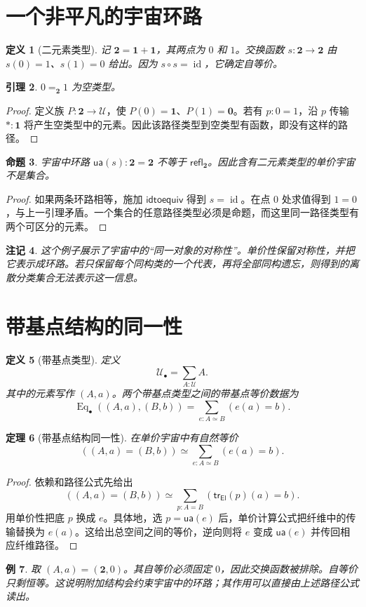 \documentclass[12pt,oneside,openany,fontset=none]{ctexbook}
\theoremstyle{cn}
\newtheorem{definition}{定义}[chapter]
\newtheorem{example}[definition]{例}
\newtheorem{lemma}[definition]{引理}
\newtheorem{proposition}[definition]{命题}
\newtheorem{theorem}[definition]{定理}
\newtheorem{remark}[definition]{注记}
\numberwithin{equation}{chapter}
\newcommand{\U}{\mathcal U}
\newcommand{\id}{\operatorname{id}}
\newcommand{\refl}{\mathsf{refl}}
\newcommand{\tr}{\mathsf{tr}}
\newcommand{\ua}{\mathsf{ua}}
\newcommand{\idtoequiv}{\mathsf{idtoequiv}}
\newcommand{\Eq}{\operatorname{Eq}}
\newcommand{\one}{\mathbf 1}
\newcommand{\zero}{\mathbf 0}
\begin{document}
\section{一个非平凡的宇宙环路}
\begin{definition}[二元素类型]
记 $\mathbf2=\one+\one$，其两点为 $0$ 和 $1$。交换函数 $s:\mathbf2\to\mathbf2$ 由 $s(0)=1$、$s(1)=0$ 给出。因为 $s\circ s=\id$，它确定自等价。
\end{definition}
\begin{lemma}
$0=_{\mathbf2}1$ 为空类型。
\end{lemma}
\begin{proof}
定义族 $P:\mathbf2\to\U$，使 $P(0)=\one$、$P(1)=\zero$。若有 $p:0=1$，沿 $p$ 传输 $*:\one$ 将产生空类型中的元素。因此该路径类型到空类型有函数，即没有这样的路径。
\end{proof}
\begin{proposition}
宇宙中环路 $\ua(s):\mathbf2=\mathbf2$ 不等于 $\refl_{\mathbf2}$。因此含有二元素类型的单价宇宙不是集合。
\end{proposition}
\begin{proof}
如果两条环路相等，施加 $\idtoequiv$ 得到 $s=\id$。在点 $0$ 处求值得到 $1=0$，与上一引理矛盾。一个集合的任意路径类型必须是命题，而这里同一路径类型有两个可区分的元素。
\end{proof}
\begin{remark}
这个例子展示了宇宙中的“同一对象的对称性”。单价性保留对称性，并把它表示成环路。若只保留每个同构类的一个代表，再将全部同构遗忘，则得到的离散分类集合无法表示这一信息。
\end{remark}

\section{带基点结构的同一性}
\begin{definition}[带基点类型]
定义
\[
\U_\bullet=\sum_{A:\U}A.
\]
其中的元素写作 $(A,a)$。两个带基点类型之间的带基点等价数据为
\[
\Eq_\bullet((A,a),(B,b))
=\sum_{e:A\simeq B}(e(a)=b).
\]
\end{definition}
\begin{theorem}[带基点结构同一性]
在单价宇宙中有自然等价
\[
((A,a)=(B,b))\simeq
\sum_{e:A\simeq B}(e(a)=b).
\]
\end{theorem}
\begin{proof}
依赖和路径公式先给出
\[
((A,a)=(B,b))\simeq
\sum_{p:A=B}(\tr_{\mathsf{El}}(p)(a)=b).
\]
用单价性把底 $p$ 换成 $e$。具体地，选 $p=\ua(e)$ 后，单价计算公式把纤维中的传输替换为 $e(a)$。这给出总空间之间的等价，逆向则将 $e$ 变成 $\ua(e)$ 并传回相应纤维路径。
\end{proof}
\begin{example}
取 $(A,a)=(\mathbf2,0)$。其自等价必须固定 $0$，因此交换函数被排除。自等价只剩恒等。这说明附加结构会约束宇宙中的环路；其作用可以直接由上述路径公式读出。
\end{example}
\end{document}
